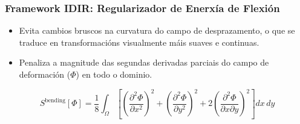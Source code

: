 \documentclass[xcolor=dvipsnames]{beamer}
\begin{document}
\begin{frame}
\frametitle{Framework IDIR: Regularizador de Enerxía de Flexión}

\begin{itemize}
    \item Evita cambios bruscos na curvatura do campo de desprazamento, o que se traduce en transformacións visualmente máis suaves e continuas.
    \vspace{0.3cm}
    \item Penaliza a magnitude das segundas derivadas parciais do campo de deformación ($\Phi$) en todo o dominio.
    \vspace{0.3cm}
\end{itemize}



\vfill %

\centering
$$
S^{\text{bending}}[\Phi] = \frac{1}{8} \int_{\Omega} \left[ \left( \frac{\partial^2 \Phi}{\partial x^2} \right)^2 + \left( \frac{\partial^2 \Phi}{\partial y^2} \right)^2 + 2 \left( \frac{\partial^2 \Phi}{\partial x \partial y} \right)^2 \right] dx \, dy
$$


\end{frame}
\end{document}
